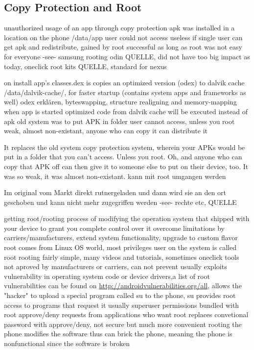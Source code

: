 \subsection{Copy Protection and Root} \label{subsection:android-root}
unauthorized usage of an app through copy protection
apk was installed in a location on the phone /data/app user could not access
useless if single user can get apk and redistribute, gained by root
successful as long as root was not easy for everyone -see- samsung rooting odin QUELLE, did not have too big impact as today, oneclick root kits QUELLE, standard for nexus

on install app's classes.dex is copies an optimized version (odex) to dalvik cache /data/dalvik-cache/, for faster startup (contains system apps and frameworks as well)
odex erklären, byteswapping, structure realigning and memory-mapping
when app is started optimized code from dalvik cache will be executed instead of apk
old system was to put APK in folder user cannot access, unless you root
weak, almost non-existant, anyone who can copy it can distribute it

It replaces the old system copy protection system, wherein your APKs would be put in a folder that you can't access. Unless you root. Oh, and anyone who can copy that APK off can then give it to someone else to put on their device, too. It was so weak, it was almost non-existant.
kann mit root umgangen werden

Im original vom Markt direkt rutnergeladen und dann wird sie an den ort geschoben und kann nicht mehr zugegriffen werden -see- rechte etc, QUELLE



getting root/rooting process of modifying the operation system that shipped with your device to grant you complete control over it
overcome limitations by carriers/manufacturers, extend system functionality, upgrade to custom flavor
root comes from Linux OS world, most privileges user on the system is called root
rooting fairly simple, many videos and tutorials, sometimes oneclick tools
not aproved by manufacturers or carriers, can not prevent usually exploits vulnerability in operating system code or device drivers,a list of root vulnerabilities can be found on \url{http://androidvulnerabilities.org/all}, allows the "hacker" to upload a special program called su to the phone,
su provides root access to programs that request it
usually superuser permissions bundled with root
approve/deny requests from applications who want root
replaces convetional password with approve/deny, not secure but much more convenient
rooting the phone modifies the software thus can brick the phone, meaning the phone is nonfunctional since the software is broken

